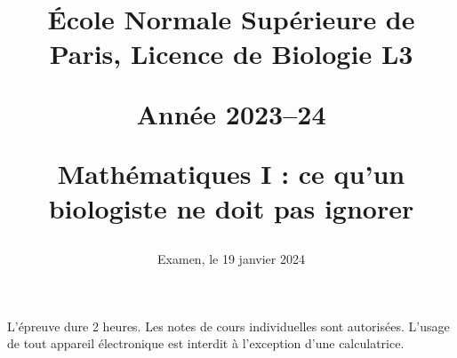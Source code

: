 \documentclass[french, 9pt]{article}
\title{\normalsize{\sc École Normale Supérieure de Paris, Licence de Biologie L3}
  
  \bigskip
  \normalsize{\sc Année 2023–24}
  
  \bigskip
  \large{\bf Mathématiques I : ce qu’un biologiste ne doit pas ignorer} 
  
}
\date{Examen, le 19 janvier 2024}
\newcommand{\alglin}{/home/robin/ENSEIGN/Cours/MathBiologie/L3-ENS-Math1/Exercices/AlgLin}
\newcommand{\multivar}{/home/robin/ENSEIGN/Cours/MathBiologie/L3-ENS-Math1/Exercices/MultiVar}
\newcommand{\equadiff}{/home/robin/ENSEIGN/Cours/MathBiologie/L3-ENS-Math1/Exercices/EquaDiff}
\newcommand{\probas}{/home/robin/ENSEIGN/Cours/MathBiologie/L3-ENS-Math1/Exercices/Probas}
\begin{document}

\maketitle

\bigskip
L'épreuve dure 2 heures. 
Les notes de cours individuelles sont autorisées.
L’usage de tout appareil électronique est interdit à l’exception d’une calculatrice.

% 

% 








\end{document}
